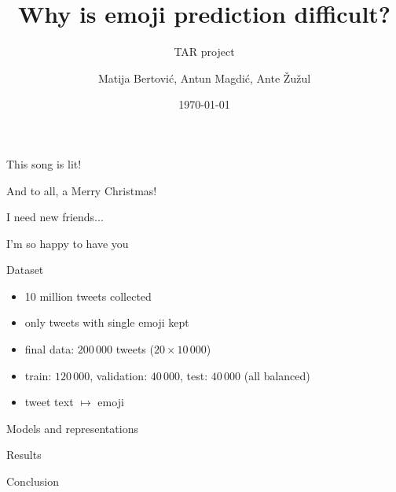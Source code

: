 \documentclass{beamer}
\title{Why is emoji prediction difficult?}
\subtitle{TAR project}
\author{Matija Bertović, Antun Magdić, Ante Žužul}
\institute{University of Zagreb \\ Faculty of Electrical Engineering and Computing}
\date{\today}
\begin{document}
\maketitle

\begin{frame}{}
	\begin{displayquote}
		This song is lit! \pause {} \pause
	\end{displayquote}
	\begin{displayquote}
		And to all, a Merry Christmas! \pause {} \pause
	\end{displayquote}
	\begin{displayquote}
		I need new friends... \pause {} \pause {} \pause
	\end{displayquote}
	\begin{displayquote}
		I'm so happy to have you \pause {}    \emoji{1F60D}
	\end{displayquote}
\end{frame}



\begin{frame}{Dataset}
	\begin{itemize}
		\item 10 million tweets collected
		\item only tweets with single emoji kept
		\item final data: $200\,000$ tweets ($20 \times 10\,000$)
		\item train: $120\,000$, validation: $40\,000$, test: $40\,000$ (all balanced) 
		\item tweet text $\mapsto$ emoji
	\end{itemize}
\end{frame}


\begin{frame}{Models and representations}

\end{frame}


\begin{frame}{Results}

\end{frame}


\begin{frame}{Conclusion}

\end{frame}
\end{document}
